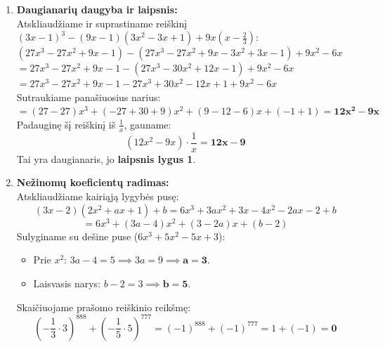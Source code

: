 \documentclass[12pt,a4paper]{article}
\begin{document}
\begin{enumerate}
    \vspace{0.3cm}
    \item \textbf{Daugianarių daugyba ir laipsnis:} \\
    Atskliaudžiame ir suprastiname reiškinį $(3x-1)^3 - (9x-1)(3x^2 - 3x + 1) + 9x\left(x - \frac{2}{3}\right)$: \\
    $ (27x^3 - 27x^2 + 9x - 1) - (27x^3 - 27x^2 + 9x - 3x^2 + 3x - 1) + 9x^2 - 6x $ \\
    $ = 27x^3 - 27x^2 + 9x - 1 - (27x^3 - 30x^2 + 12x - 1) + 9x^2 - 6x $ \\
    $ = 27x^3 - 27x^2 + 9x - 1 - 27x^3 + 30x^2 - 12x + 1 + 9x^2 - 6x $ \\
    Sutraukiame panašiuosius narius: \\
    $ = (27-27)x^3 + (-27+30+9)x^2 + (9-12-6)x + (-1+1) = \mathbf{12x^2 - 9x} $ \\
    Padauginę šį reiškinį iš $\frac{1}{x}$, gauname:
    $$ (12x^2 - 9x) \cdot \frac{1}{x} = \mathbf{12x - 9} $$
    Tai yra daugianaris, jo \textbf{laipsnis lygus 1}.

    \vspace{0.3cm}
    \item \textbf{Nežinomų koeficientų radimas:} \\
    Atskliaudžiame kairiąją lygybės pusę:
    $$ (3x-2)(2x^2+ax+1) + b = 6x^3 + 3ax^2 + 3x - 4x^2 - 2ax - 2 + b $$
    $$ = 6x^3 + (3a-4)x^2 + (3-2a)x + (b-2) $$
    Sulyginame su dešine puse ($6x^3 + 5x^2 - 5x + 3$):
    \begin{itemize}
        \item Prie $x^2$: $3a - 4 = 5 \implies 3a = 9 \implies \mathbf{a = 3}$.
        \item Laisvasis narys: $b - 2 = 3 \implies \mathbf{b = 5}$.
    \end{itemize}
    Skaičiuojame prašomo reiškinio reikšmę:
    $$ \left(-\frac{1}{3} \cdot 3\right)^{888} + \left(-\frac{1}{5} \cdot 5\right)^{777} = (-1)^{888} + (-1)^{777} = 1 + (-1) = \mathbf{0} $$

\end{enumerate}
\end{document}
